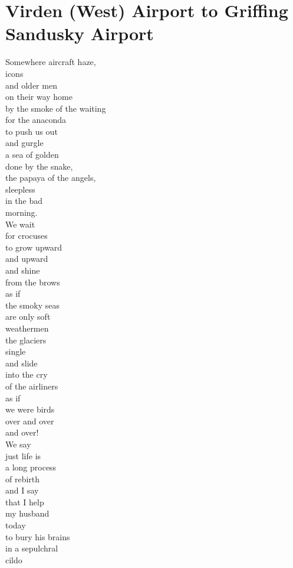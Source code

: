 \documentclass[smalldemyvopaper,11pt,twoside,onecolumn,openright,extrafontsizes]{memoir}
\begin{document}
\chapter{Virden (West) Airport to Griffing Sandusky Airport}
Somewhere aircraft haze,
\\icons
\\and older men
\\on their way home
\\by the smoke of the waiting
\\for the anaconda
\\to push us out
\\and gurgle
\\a sea of golden
\\done by the snake,
\\the papaya of the angels,
\\sleepless
\\in the bad
\\morning.
\\We wait
\\for crocuses
\\to grow upward
\\and upward
\\and shine
\\from the brows
\\as if
\\the smoky seas
\\are only soft
\\weathermen
\\the glaciers
\\single
\\and slide
\\into the cry
\\of the airliners
\\as if
\\we were birds
\\over and over
\\and over!
\\We say
\\just life is
\\a long process
\\of rebirth
\\and I say
\\that I help
\\my husband
\\today
\\to bury his brains
\\in a sepulchral
\\cildo
\end{document}
